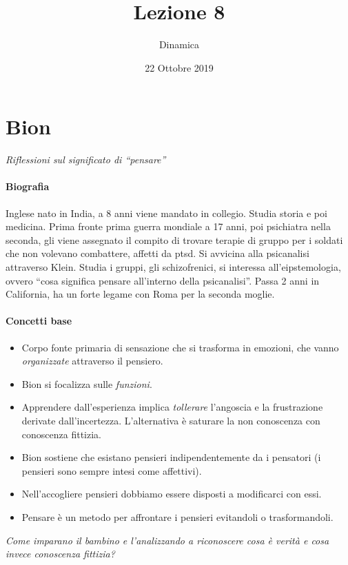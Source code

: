 \documentclass[12pt, a4paper]{article}
\date{22 Ottobre 2019}
\title{Lezione 8}
\author{Dinamica}
\begin{document}
\thispagestyle{empty}
\maketitle

\section{Bion}

\emph{Riflessioni sul significato di ``pensare''}

\paragraph{Biografia} Inglese nato in India, a 8 anni viene mandato in collegio. Studia storia e poi medicina. Prima fronte prima guerra mondiale a 17 anni, poi psichiatra nella seconda, gli viene assegnato il compito di trovare terapie di gruppo per i soldati che non volevano combattere, affetti da ptsd. Si avvicina alla psicanalisi attraverso Klein. Studia i gruppi, gli schizofrenici, si interessa all'eipstemologia, ovvero ``cosa significa pensare
all'interno della psicanalisi''. Passa 2 anni in California, ha un forte legame con Roma per la seconda moglie.\\
\smallskip
\paragraph{Concetti base}
\begin{itemize}
    \item Corpo fonte primaria di sensazione che si trasforma in emozioni, che vanno \emph{organizzate} attraverso il pensiero.
    \item Bion si focalizza sulle \emph{funzioni}.
    \item Apprendere dall'esperienza implica \emph{tollerare} l'angoscia e la frustrazione derivate dall'incertezza. L'alternativa \`e saturare la non conoscenza con conoscenza fittizia.
    \item Bion sostiene che esistano pensieri indipendentemente da i pensatori (i pensieri sono sempre intesi come affettivi).
    \item Nell'accogliere  pensieri dobbiamo essere disposti a modificarci con essi.
    \item Pensare \`e un metodo per affrontare i pensieri evitandoli o trasformandoli.
\end{itemize}

\emph{Come imparano il bambino e l'analizzando a riconoscere cosa \`e verit\`a e cosa invece conoscenza fittizia?}
\end{document}
